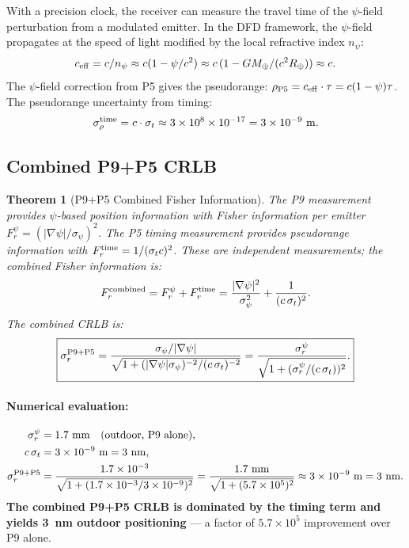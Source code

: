\documentclass[aps,prd,twocolumn,superscriptaddress,nofootinbib]{revtex4-2}
\newtheorem{theorem}{Theorem}
\begin{document}
With a precision clock, the receiver can measure the travel time of
the $\psi$-field perturbation from a modulated emitter.  In the DFD
framework, the $\psi$-field propagates at the speed of light modified
by the local refractive index $n_\psi$:
\begin{equation}
  c_{\rm eff} = c/n_\psi \approx c(1 - \psi/c^2)
  \approx c\,(1 - GM_\oplus/(c^2 R_\oplus)) \approx c.
  \label{eq:c-eff}
\end{equation}
The $\psi$-field correction from P5 gives the pseudorange:
$\rho_{\rm P5} = c_{\rm eff}\cdot\tau = c(1-\psi)\tau$.
The pseudorange uncertainty from timing:
\begin{equation}
  \sigma_\rho^{\rm time} = c \cdot \sigma_t
  \approx 3\times10^8 \times 10^{-17} = 3\times10^{-9}~\mathrm{m}.
  \label{eq:sigma-rho-time}
\end{equation}

\subsection{Combined P9+P5 CRLB}

\begin{theorem}[P9+P5 Combined Fisher Information]
\label{thm:p9p5-fim}
The P9 measurement provides $\psi$-based position information with
Fisher information per emitter $F_r^\psi = (|\nabla\psi|/\sigma_\psi)^2$.
The P5 timing measurement provides pseudorange information with
$F_r^{\rm time} = 1/(\sigma_t c)^2$.  These are \emph{independent}
measurements; the combined Fisher information is:
\begin{equation}
  F_r^{\rm combined} = F_r^\psi + F_r^{\rm time}
  = \frac{|\nabla\psi|^2}{\sigma_\psi^2} + \frac{1}{(c\,\sigma_t)^2}.
  \label{eq:combined-fim}
\end{equation}
The combined CRLB is:
\begin{equation}
  \boxed{
  \sigma_r^{\rm P9+P5} = \frac{\sigma_\psi/|\nabla\psi|}
  {\sqrt{1 + (|\nabla\psi|\sigma_\psi)^{-2}/(c\,\sigma_t)^{-2}}}
  = \frac{\sigma_r^{\psi}}
  {\sqrt{1 + (\sigma_r^\psi / (c\,\sigma_t))^2}}.
  }
  \label{eq:combined-crlb}
\end{equation}
\end{theorem}

\paragraph{Numerical evaluation:}
\begin{align}
  \sigma_r^\psi &= 1.7~\mathrm{mm} \quad\text{(outdoor, P9 alone)}, \\
  c\,\sigma_t &= 3\times10^{-9}~\mathrm{m} = 3~\mathrm{nm}, \\
  \sigma_r^{\rm P9+P5} &= \frac{1.7\times10^{-3}}
  {\sqrt{1 + (1.7\times10^{-3}/3\times10^{-9})^2}}
  = \frac{1.7~\mathrm{mm}}{\sqrt{1 + (5.7\times10^5)^2}}
  \approx 3\times10^{-9}~\mathrm{m} = 3~\mathrm{nm}.
\end{align}
\textbf{The combined P9+P5 CRLB is dominated by the timing term and
yields 3~nm outdoor positioning} --- a factor of $5.7\times10^5$
improvement over P9 alone.
\end{document}
